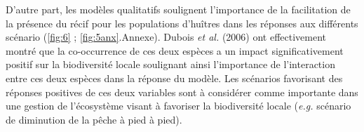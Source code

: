 \documentclass[12pt]{report}
\begin{document}
\newline \newline
D'autre part, les modèles qualitatifs soulignent l’importance de la facilitation de la présence du récif pour les populations d’huîtres dans les réponses aux différents scénario (\autoref{fig:6} ; \autoref{fig:5anx}.Annexe). Dubois \textit{et al.} (2006) ont effectivement montré que la co-occurrence de ces deux espèces a un impact significativement positif sur la biodiversité locale soulignant ainsi l’importance de l’interaction entre ces deux espèces dans la réponse du modèle. Les scénarios favorisant des réponses positives de ces deux variables sont à considérer comme importante dans une gestion de l’écosystème visant à favoriser la biodiversité locale (\textit{e.g.} scénario de diminution de la pêche à pied à pied).
\end{document}
